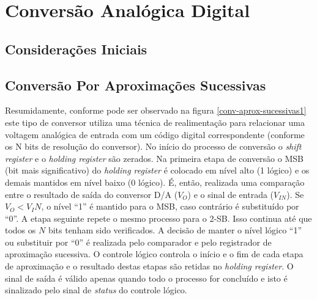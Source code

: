 \section{Conversão Analógica Digital}
\label{secao-conv-analogica-digital}	
	\subsection{Considerações Iniciais}
		
	\subsection{Conversão Por Aproximações Sucessivas}
		
		Resumidamente, conforme pode ser observado na figura \ref{conv-aprox-sucessivas1} este tipo de conversor utiliza uma técnica de realimentação para relacionar uma voltagem analógica de entrada com um código digital correspondente (conforme os N bits de resolução do conversor). No início do processo de conversão o \textit{shift register} e o \textit{holding register} são zerados. Na primeira etapa de conversão o MSB (bit mais significativo) do \textit{holding register} é colocado em	nível alto (1 lógico) e os demais mantidos em nível baixo (0 lógico). É, então, realizada uma comparação entre o resultado de saída do conversor D/A ($V_O$) e o sinal de entrada ($V_{IN}$). Se $V_O < V_IN$, o nível “1” é mantido para o MSB, caso contrário é substituído por “0”. A etapa seguinte repete o mesmo processo para o 2-SB. Isso continua até que todos os $N$ bits tenham sido verificados. A decisão de manter o nível lógico “1” ou substituir por “0” é realizada pelo comparador e pelo registrador de aproximação sucessiva. O controle lógico controla o início e o fim de cada etapa de aproximação e o resultado destas etapas são retidas no \textit{holding register}. O sinal de saída é válido apenas quando todo o processo for concluído e isto é sinalizado pelo sinal de \textit{status} do controle lógico.
		
